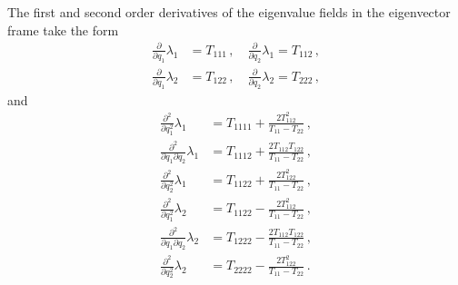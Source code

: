 \documentclass[a4paper, 11pt]{article}
\begin{document}
The first and second order derivatives of the eigenvalue fields in the eigenvector frame take the form
\begin{align}
\frac{\partial}{\partial q_1} \lambda_1&= T_{111}\,,\quad
\frac{\partial}{\partial q_2} \lambda_1= T_{112}\,,\\
\frac{\partial}{\partial q_1} \lambda_2&= T_{122}\,,\quad
\frac{\partial}{\partial q_2} \lambda_2= T_{222}\,,
\end{align}
and 
\begin{align}
\frac{\partial^2}{\partial q_1^2} \lambda_1&= T_{1111} + \frac{2 T_{112}^2}{T_{11}-T_{22}}\,,\\
\frac{\partial^2}{\partial q_1 \partial q_2} \lambda_1&= T_{1112} + \frac{2 T_{112}T_{122}}{T_{11}-T_{22}}\,,\\
\frac{\partial^2}{\partial q_2^2} \lambda_1&= T_{1122} + \frac{2T_{122}^2}{T_{11}-T_{22}}\,,\\
\frac{\partial^2}{\partial q_1^2} \lambda_2&= T_{1122} - \frac{2 T_{112}^2}{T_{11}-T_{22}}\,,\\
\frac{\partial^2}{\partial q_1 \partial q_2} \lambda_2&= T_{1222} - \frac{2 T_{112}T_{122}}{T_{11}-T_{22}}\,,\\
\frac{\partial^2}{\partial q_2^2} \lambda_2&= T_{2222} - \frac{2T_{122}^2}{T_{11}-T_{22}}\,.
\end{align}
\end{document}
